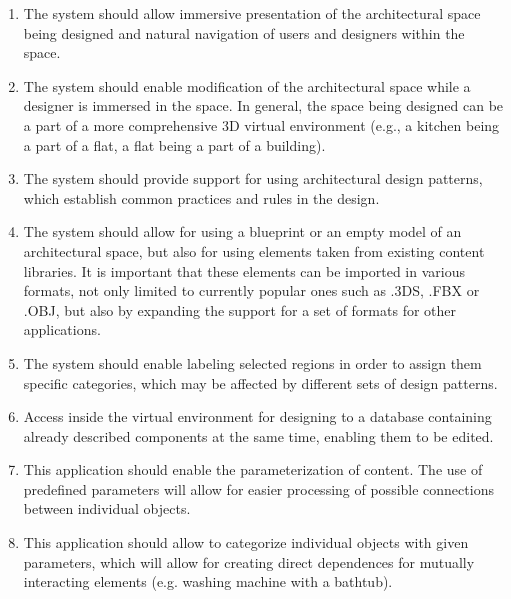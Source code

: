 \documentclass[runningheads]{llncs}
\begin{document}
\begin{enumerate}
\item	\label{req-vr} The system should allow immersive presentation of the architectural space being designed and natural navigation of users and designers within the space.\\

\item	\label{req-edit-vr} The system should enable modification of the architectural space while a designer is immersed in the space. In general, the space being designed can be a part of a more comprehensive 3D virtual environment (e.g., a kitchen being a part of a flat, a flat being a part of a building).\\

\item \label{req-pattnerns} The system should provide support for using architectural design patterns, which establish common practices and rules in the design. \\

\item \label{req-libraries} The system should allow for using a blueprint or an empty model of an architectural space, but also for using elements taken from existing content libraries. It is important that these elements can be imported in various formats, not only limited to currently popular ones such as .3DS, .FBX or .OBJ, but also by expanding the support for a set of formats for other applications.\\

\item	\label{req-labeling} The system should enable labeling selected regions in order to assign them specific categories, which may be affected by different sets of design patterns.\\


\item	\label{req-components} Access inside the virtual environment for designing to a database containing already described components at the same time, enabling them to be edited.\\

\item	\label{req-param} This application should enable the parameterization of content. The use of predefined parameters will allow for easier processing of possible connections between individual objects.\\

\item	\label{req-categories} This application should allow to categorize individual objects with given parameters, which will allow for creating direct dependences for mutually interacting elements (e.g. washing machine with a bathtub).\\


\end{enumerate}
\end{document}

